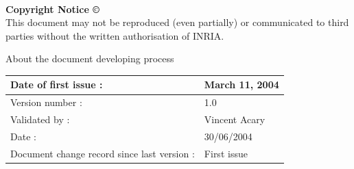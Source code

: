 \textsf{ }\\
\begin{center}
\textbf{Copyright Notice \copyright}\\
This document may not be reproduced (even partially) or communicated to third parties without the written authorisation of INRIA.
\end{center}




\pagebreak
\begin{center}
  \textsf{\Large About the document developing process}
\end{center}
\begin{tabular}{|p{}|p{}|}
\hline
Date of first issue : &\textsf{March 11, 2004}\\
\hline \hline
Version number : &\textsf{1.0}\\ 
Validated by :& \textsf{Vincent Acary}\\
Date : & \textsf{30/06/2004} \\
Document change record since last version : &\textsf{First issue} \\
\hline
\end{tabular}



%

